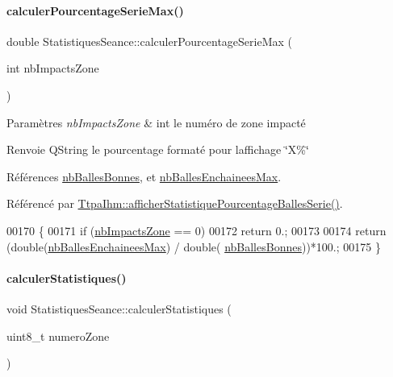\paragraph{\texorpdfstring{calculer\+Pourcentage\+Serie\+Max()}{calculerPourcentageSerieMax()}}
{\footnotesize\ttfamily double Statistiques\+Seance\+::calculer\+Pourcentage\+Serie\+Max (\begin{DoxyParamCaption}\item[{int}]{nb\+Impacts\+Zone }\end{DoxyParamCaption})}


\begin{DoxyParams}{Paramètres}
{\em nb\+Impacts\+Zone} & int le numéro de zone impacté \\
\hline
\end{DoxyParams}
\begin{DoxyReturn}{Renvoie}
Q\+String le pourcentage formaté pour l\textquotesingle{}affichage \char`\"{}\+X\%\char`\"{} 
\end{DoxyReturn}


Références \hyperlink{class_statistiques_seance_af62043be598fd6b7cd7ddbc37eadf967}{nb\+Balles\+Bonnes}, et \hyperlink{class_statistiques_seance_a3e64397e87d453efb42b2545df1a8e90}{nb\+Balles\+Enchainees\+Max}.



Référencé par \hyperlink{class_ttpa_ihm_aec988dc2398578eb8e91563d1ba58cde}{Ttpa\+Ihm\+::afficher\+Statistique\+Pourcentage\+Balles\+Serie()}.


\begin{DoxyCode}
00170 \{
00171     \textcolor{keywordflow}{if} (\hyperlink{class_statistiques_seance_aa4a040cda282d5b1c250025f8e191e20}{nbImpactsZone} == 0)
00172         \textcolor{keywordflow}{return} 0.;
00173 
00174     \textcolor{keywordflow}{return} (\textcolor{keywordtype}{double}(\hyperlink{class_statistiques_seance_a3e64397e87d453efb42b2545df1a8e90}{nbBallesEnchaineesMax}) / \textcolor{keywordtype}{double}(
      \hyperlink{class_statistiques_seance_af62043be598fd6b7cd7ddbc37eadf967}{nbBallesBonnes}))*100.;
00175 \}
\end{DoxyCode}
\mbox{\label{class_statistiques_seance_a8bf60224113e3697adfe0a4f8f22ab7b}} 
\paragraph{\texorpdfstring{calculer\+Statistiques()}{calculerStatistiques()}}
{\footnotesize\ttfamily void Statistiques\+Seance\+::calculer\+Statistiques (\begin{DoxyParamCaption}\item[{uint8\+\_\+t}]{numero\+Zone }\end{DoxyParamCaption})\hspace{0.3cm}{\ttfamily [private]}}



